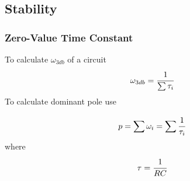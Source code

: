 \subsection{Stability}\vspace{0.5em}
\subsubsection{Zero-Value Time Constant}\vspace{0.5em}
\setlength{\abovedisplayshortskip}{15pt}
\setlength{\belowdisplayshortskip}{15pt}
To calculate $\omega_{3db}$ of a circuit
{\large $$ \omega_{3db} = \cfrac{1}{\sum \tau_i } $$}
To calculate dominant pole use 

\setlength{\abovedisplayshortskip}{15pt}
\setlength{\belowdisplayshortskip}{15pt}

$$ p = \sum \omega_i = \sum \cfrac{1}{ \tau_i } $$
where
$$ \tau = \cfrac{1}{R C} $$
